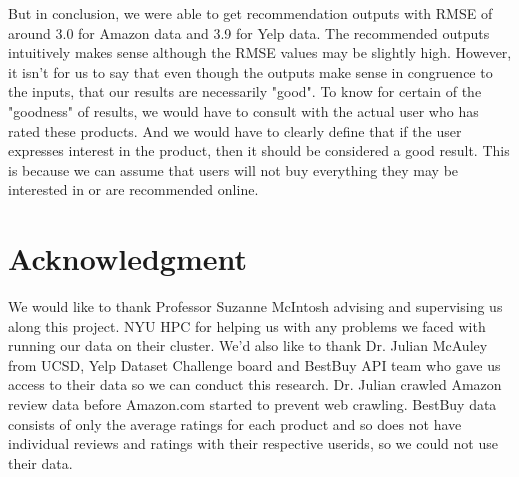 \documentclass[conference]{IEEEtran}
\begin{document}
But in conclusion, we were able to get recommendation outputs with RMSE of around 3.0 for Amazon data and 3.9 for Yelp data.  The recommended outputs intuitively makes sense although the RMSE values may be slightly high.  However, it isn't for us to say that even though the outputs make sense in congruence to the inputs, that our results are necessarily "good".  To know for certain of the "goodness" of results, we would have to consult with the actual user who has rated these products.  And we would have to clearly define that if the user expresses interest in the product, then it should be considered a good result.  This is because we can assume that users will not buy everything they may be interested in or are recommended online.  

\section*{Acknowledgment}

We would like to thank Professor Suzanne McIntosh advising and supervising us along this project. NYU HPC for helping us with any problems we faced with running our data on their cluster. We'd also like to thank Dr. Julian McAuley from UCSD, Yelp Dataset Challenge board \cite{YelpDataset} and BestBuy API team who gave us access to their data so we can conduct this research. Dr. Julian crawled Amazon review data before Amazon.com started to prevent web crawling. BestBuy data consists of only the average ratings for each product and so does not have individual reviews and ratings with their respective userids, so we could not use their data. 
\end{document}
